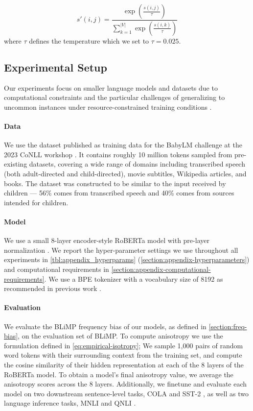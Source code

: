 $$
s'(i,j) = \frac{\exp\left(\frac{s(i,j)}{\tau}\right)}{\sum_{k=1}^{|V|} \exp\left(\frac{s(i,k)}{\tau}\right)}
$$
where $\tau$ defines the temperature which we set to $\tau=0.025$.

\subsection{Experimental Setup}
\label{subsection:experimental_setup}

Our experiments focus on smaller language models and datasets due to computational constraints and the particular challenges of generalizing to uncommon instances under resource-constrained training conditions \citep{warstadt2023findings, diehlmartinez2023climb}. 

\paragraph{Data} \label{paragraph:data} We use the dataset published as training data for the BabyLM challenge at the 2023 CoNLL workshop \citep{warstadt2023findings}. It contains roughly 10 million tokens sampled from pre-existing datasets, covering a wide range of domains including transcribed speech (both adult-directed and child-directed), movie subtitles, Wikipedia articles, and books. The dataset was constructed to be similar to the input received by children --- 56\% comes from transcribed speech and 40\% comes from sources intended for children.

\paragraph{Model} We use a small 8-layer encoder-style RoBERTa model with pre-layer normalization \cite{huebner2021babyberta}. We report the hyper-parameter settings we use throughout all experiments in \cref{tbl:appendix_hyperparams} (\cref{section:appendix-hyperparameters}) and computational requirements in \cref{section:appendix-computational-requirements}. We use a BPE tokenizer \citep{sennrich2016bpe} with a vocabulary size of 8192 as recommended in previous work \cite{diehlmartinez2023climb}. 

\paragraph{Evaluation} We evaluate the BLiMP frequency bias of our models, as defined in \cref{section:freq-bias}, on the evaluation set of BLiMP. To compute anisotropy we use the formulation defined in \cref{eq:empirical-isotropy}; We sample 1,000 pairs of random word tokens with their surrounding context from the training set, and compute the cosine similarity of their hidden representation at each of the 8 layers of the RoBERTa model. To obtain a model's final anisotropy value, we average the anisotropy scores across the 8 layers. Additionally, we finetune and evaluate each model on two downstream sentence-level tasks, COLA \citep{warstadt2019cola} and SST-2 \citep{socher2013sst}, as well as two language inference tasks, MNLI \citep{williams2018mnli} and QNLI \citep{rajpurkar2016squad, wang2018glue}.

